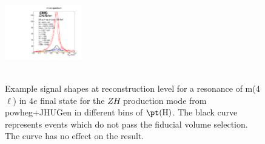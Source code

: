 \begin{figure}[htb]
\begin{center}
{      \includegraphics[width=0.3\textwidth,angle=0]{Figures/Appendix//ZH_powheg_JHUgen_125_4e_pT4l_genbin4_recobin4_effs_genWeight*pileupWeight*dataMCWeight.pdf}
      \label{fig:sigfits-pT4l-ZH-powheg15-JHUgen-125-maintext:e}
    }
     \\
    \\
    \caption{ Example signal shapes at reconstruction level for a resonance of m(4$\ell$) in $4e$ final state for the $ZH$ production mode from {\sc powheg+JHUGen} in different bins of $\pt(\mathrm{H})$. The black curve represents events which do not pass the fiducial volume selection. The curve has no effect on the result.
    }
  \label{fig:sigfits-pT4l-ZH-powheg15-JHUgen-125-maintext}
 \end{center}
\end{figure} \clearpage

